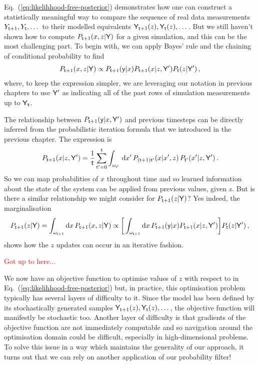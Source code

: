 Eq.~(\ref{eq:likelihhood-free-posterior}) demonstrates how one can construct a statistically meaningful way to compare the sequence of real data measurements $Y_{{\sf t}+1}, Y_{{\sf t}}, \dots$ to their modelled equivalents ${\sf Y}_{{\sf t}+1}(z), {\sf Y}_{{\sf t}}(z), \dots$. But we still haven't shown how to compute $P_{{\sf t}+1}(x,z\vert {\sf Y})$ for a given simulation, and this can be the most challenging part. To begin with, we can apply Bayes' rule and the chaining of conditional probability to find 
\begin{align}
P_{{\sf t}+1}(x,z\vert {\sf Y}) \propto P_{{\sf t}+1}({\sf y}\vert x)P_{{\sf t}+1}(x\vert z, {\sf Y}')P_{{\sf t}}(z\vert {\sf Y}') \,,
\end{align}
where, to keep the expression simpler, we are leveraging our notation in previous chapters to use ${\sf Y}'$ as indicating all of the past rows of simulation measurements up to ${\sf Y}_{{\sf t}}$. 

The relationship between $P_{{\sf t}+1}({\sf y}\vert x, {\sf Y}')$ and previous timesteps can be directly inferred from the probabilistic iteration formula that we introduced in the previous chapter. The expression is
\begin{align} 
P_{{\sf t}+1}(x\vert z, {\sf Y}') = \frac{1}{{\sf t}}\sum_{{\sf t}'=0}^{{\sf t}}\int_{\omega_{{\sf t}'}} \,{\rm d}x' \, P_{({\sf t}+1){\sf t}'}(x\vert x',z)\, P_{{\sf t}'}(x'\vert z, {\sf Y}') \,.
\end{align}
So we can map probabilities of $x$ throughout time and so learned information about the state of the system can be applied from previous values, given $z$. But is there a similar relationship we might consider for $P_{{\sf t}+1}(z\vert {\sf Y})$? Yes indeed, the marginalisation
\begin{align} 
P_{{\sf t}+1}(z\vert {\sf Y}) = \int_{\omega_{{\sf t}+1}} {\rm d}x \, P_{{\sf t}+1}(x,z\vert {\sf Y}) \propto \bigg[ \int_{\omega_{{\sf t}+1}} {\rm d}x \, P_{{\sf t}+1}({\sf y}\vert x) P_{{\sf t}+1}(x\vert z, {\sf Y}') \bigg] P_{{\sf t}}(z\vert {\sf Y}')\,,
\end{align}
shows how the $z$ updates can occur in an iterative fashion. 

\textcolor{red}{Got up to here...}

We now have an objective function to optimise values of $z$ with respect to in Eq.~(\ref{eq:likelihhood-free-posterior}) but, in practice, this optimisation problem typically has several layers of difficulty to it. Since the model has been defined by its stochastically generated samples ${\sf Y}_{{\sf t}+1}(z), {\sf Y}_{{\sf t}}(z), \dots$, the objective function will manifestly be stochastic too. Another layer of difficulty is that gradients of the objective function are not immediately computable and so navigation around the optimisation domain could be difficult, especially in high-dimensional problems. To solve this issue in a way which maintains the generality of our approach, it turns out that we can rely on another application of our probability filter!

